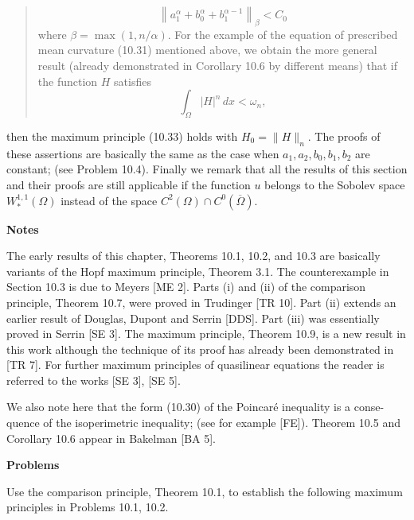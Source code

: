\begin{quote}
\begin{equation}
\tag{10.34}
\left\|a_1^{\alpha} + b_0^{\alpha} + b_1^{\alpha-1}\right\|_{\beta} < C_0
\end{equation}
where $\beta = \max(1,n/\alpha)$. For the example of the equation of prescribed mean curvature (10.31) mentioned above, we obtain the more general result (already demonstrated in Corollary 10.6 by different means) that if the function $H$ satisfies
\begin{equation}
\tag{10.35}
\int_{\Omega} |H|^n\,dx < \omega_n,
\end{equation}
\end{quote}


then the maximum principle (10.33) holds with $H_0 = \|H\|_{n}$. The proofs of these
assertions are basically the same as the case when $a_1, a_2, b_0, b_1, b_2$ are constant; (see
Problem 10.4). Finally we remark that all the results of this section and their proofs
are still applicable if the function $u$ belongs to the Sobolev space $W^{1,1}_{\ast}(\Omega)$ instead of
the space $C^2(\Omega) \cap C^0(\overline{\Omega})$.

\bigskip

\textbf{Notes}

The early results of this chapter, Theorems 10.1, 10.2, and 10.3 are basically
variants of the Hopf maximum principle, Theorem 3.1. The counterexample in
Section 10.3 is due to Meyers [ME 2]. Parts (i) and (ii) of the comparison principle,
Theorem 10.7, were proved in Trudinger [TR 10]. Part (ii) extends an earlier result
of Douglas, Dupont and Serrin [DDS]. Part (iii) was essentially proved in Serrin
[SE 3]. The maximum principle, Theorem 10.9, is a new result in this work although
the technique of its proof has already been demonstrated in [TR 7]. For further
maximum principles of quasilinear equations the reader is referred to the works
[SE 3], [SE 5].

\noindent
We also note here that the form (10.30) of the Poincar\'e inequality is a conse-
quence of the isoperimetric inequality; (see for example [FE]). Theorem 10.5 and
Corollary 10.6 appear in Bakelman [BA 5].

\bigskip

\textbf{Problems}

Use the comparison principle, Theorem 10.1, to establish the following maximum
principles in Problems 10.1, 10.2.

\medskip

